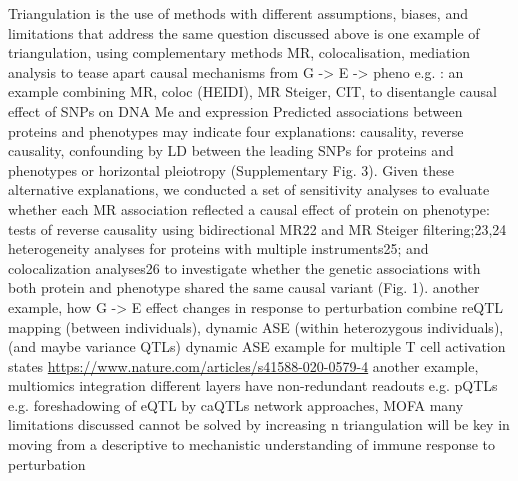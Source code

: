 \begin{outline}
\1 Triangulation is the use of methods with different assumptions, biases, and limitations that address the same question \autocite{munafo2018RobustResearchNeeds}
    \2 discussed above is one example of triangulation, using complementary methods MR, colocalisation, mediation analysis to tease apart causal mechanisms from G -> E -> pheno
        \3 e.g. \textcite{taylor2019IntegrativeAnalysisGene}: an example combining MR, coloc (HEIDI), MR Steiger, CIT, to disentangle causal effect of SNPs on DNA Me and expression
        \3 \autocite{zheng2019PhenomewideMendelianRandomization} Predicted associations between proteins and phenotypes may indicate four explanations: causality, reverse causality, confounding by LD between the leading SNPs for proteins and phenotypes or horizontal pleiotropy (Supplementary Fig. 3). Given these alternative explanations, we conducted a set of sensitivity analyses to evaluate whether each MR association reflected a causal effect of protein on phenotype: tests of reverse causality using bidirectional MR22 and MR Steiger filtering;23,24 heterogeneity analyses for proteins with multiple instruments25; and colocalization analyses26 to investigate whether the genetic associations with both protein and phenotype shared the same causal variant (Fig. 1). 
    \2 another example, how G -> E effect changes in response to perturbation
        \3 combine reQTL mapping (between individuals), dynamic ASE (within heterozygous individuals), (and maybe variance QTLs)
        \3 dynamic ASE example for multiple T cell activation states \url{https://www.nature.com/articles/s41588-020-0579-4}
    \1 another example, multiomics integration
        \2 different layers have non-redundant readouts
        \2 e.g. pQTLs
        \2 e.g. foreshadowing of eQTL by caQTLs 
        \2 network approaches, MOFA
\1 many limitations discussed cannot be solved by increasing n
\1 triangulation will be key in moving from a descriptive to mechanistic understanding of immune response to perturbation


\end{outline}


